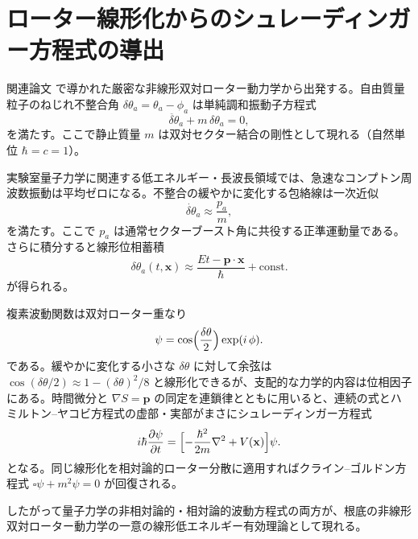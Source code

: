 \documentclass[a4paper]{article}
\begin{document}
\section{ローター線形化からのシュレーディンガー方程式の導出}

関連論文 \cite{dst-dynamic-equation} で導かれた厳密な非線形双対ローター動力学から出発する。自由質量粒子のねじれ不整合角 \(\delta\theta_a = \theta_a - \phi_a\) は単純調和振動子方程式
\[
\ddot{\delta\theta}_a + m\,\delta\theta_a = 0,
\]
を満たす。ここで静止質量 \(m\) は双対セクター結合の剛性として現れる（自然単位 \(\hbar = c = 1\)）。

実験室量子力学に関連する低エネルギー・長波長領域では、急速なコンプトン周波数振動は平均ゼロになる。不整合の緩やかに変化する包絡線は一次近似
\[
\dot{\delta\theta}_a \approx \frac{p_a}{m},
\]
を満たす。ここで \(p_a\) は通常セクターブースト角に共役する正準運動量である。さらに積分すると線形位相蓄積
\[
\delta\theta_a(t,\mathbf{x}) \approx \frac{E t - \mathbf{p}\cdot\mathbf{x}}{\hbar} + \text{const}.
\]
が得られる。

複素波動関数は双対ローター重なり
\[
\psi = \cos\Bigl(\frac{\delta\theta}{2}\Bigr)\exp(i\,\phi).
\]
である。緩やかに変化する小さな \(\delta\theta\) に対して余弦は \(\cos(\delta\theta/2) \approx 1 - (\delta\theta)^2/8\) と線形化できるが、支配的な力学的内容は位相因子にある。時間微分と \(\nabla S = \mathbf{p}\) の同定を連鎖律とともに用いると、連続の式とハミルトン--ヤコビ方程式の虚部・実部がまさにシュレーディンガー方程式
\[
i\hbar\frac{\partial\psi}{\partial t} = \Bigl[-\frac{\hbar^2}{2m}\nabla^2 + V(\mathbf{x})\Bigr]\psi.
\]
となる。同じ線形化を相対論的ローター分散に適用すればクライン--ゴルドン方程式 \(\square\psi + m^2\psi = 0\) が回復される。

したがって量子力学の非相対論的・相対論的波動方程式の両方が、根底の非線形双対ローター動力学の一意の線形低エネルギー有効理論として現れる。
\end{document}
